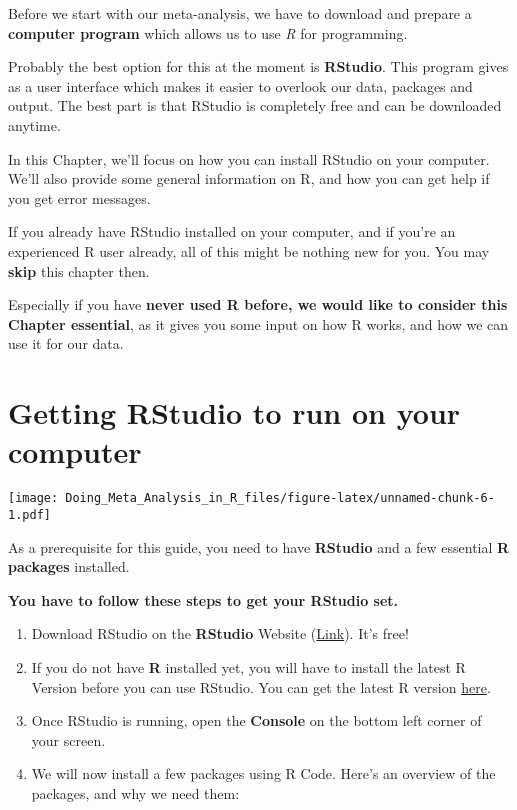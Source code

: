 \documentclass[]{book}
\providecommand{\tightlist}{%
  \setlength{\itemsep}{0pt}\setlength{\parskip}{0pt}}
\theoremstyle{definition}
\theoremstyle{definition}
\theoremstyle{definition}
\theoremstyle{remark}
\begin{document}
\begin{rmdinfo}
Before we start with our meta-analysis, we have to download and prepare
a \textbf{computer program} which allows us to use \emph{R} for
programming.

Probably the best option for this at the moment is \textbf{RStudio}.
This program gives as a user interface which makes it easier to overlook
our data, packages and output. The best part is that RStudio is
completely free and can be downloaded anytime.

In this Chapter, we'll focus on how you can install RStudio on your
computer. We'll also provide some general information on R, and how you
can get help if you get error messages.

If you already have RStudio installed on your computer, and if you're an
experienced R user already, all of this might be nothing new for you.
You may \textbf{skip} this chapter then.

Especially if you have \textbf{never used R before, we would like to
consider this Chapter essential}, as it gives you some input on how R
works, and how we can use it for our data.
\end{rmdinfo}

\hypertarget{RStudio}{\section{Getting RStudio to run on your
computer}\label{RStudio}}

\texttt{[image: Doing\_Meta\_Analysis\_in\_R\_files/figure-latex/unnamed-chunk-6-1.pdf]}

As a prerequisite for this guide, you need to have \textbf{RStudio} and
a few essential \textbf{R packages} installed.

\textbf{You have to follow these steps to get your RStudio set.}

\begin{enumerate}
\def\labelenumi{\arabic{enumi}.}
\tightlist
\item
  Download RStudio on the \textbf{RStudio} Website
  (\href{https://www.rstudio.com/products/rstudio/download/}{Link}).
  It's free!
\item
  If you do not have \textbf{R} installed yet, you will have to install
  the latest R Version before you can use RStudio. You can get the
  latest R version
  \href{https://cran.r-project.org/bin/windows/base/}{here}.
\item
  Once RStudio is running, open the \textbf{Console} on the bottom left
  corner of your screen.
\item
  We will now install a few packages using R Code. Here's an overview of
  the packages, and why we need them:
\end{enumerate}
\end{document}
